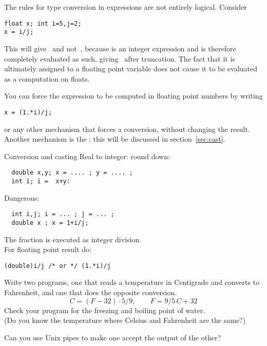 The rules for type conversion in expressions are not entirely
logical. Consider
\begin{verbatim}
float x; int i=5,j=2;
x = i/j;
\end{verbatim}
This will give~ and not~, because  is an integer
expression and is therefore completely evaluated as such, giving~
after truncation. The fact
that it is ultimately assigned to a floating point variable does not
cause it to be evaluated as a computation on floats.

You can force the expression to be computed in floating point numbers
by writing
\begin{verbatim}
x = (1.*i)/j;
\end{verbatim}
or any other mechanism that forces a conversion, without changing the
result.  Another mechanism is the ; this will be
discussed in section~\ref{sec:cast}.

\begin{slide}{Conversion and casting}
  \label{sl:convert-cast}
  Real to integer: round down:
\begin{verbatim}
  double x,y; x = .... ; y = .... ;
  int i; i =  x+y:
\end{verbatim}
Dangerous:
\begin{verbatim}
  int i,j; i = ... ; j = ... ; 
  double x ; x = 1+i/j;
\end{verbatim}
The fraction is executed as integer division.\\
For floating point result do:
\begin{verbatim}
(double)i/j /* or */ (1.*i)/j
\end{verbatim}
\end{slide}

\begin{exercise}
  \label{ex:C2F}
  Write two programs, one that reads a temperature in Centigrade and
  converts to Fahrenheit, and one that does the opposite conversion.
  \[ C = (F-32)\cdot 5/9,\qquad F = 9/5\,C+32 \]
  Check your program for the freezing and boiling point of water.\\
  (Do you know the temperature where Celsius and Fahrenheit are the
  same?)
  
  Can you use Unix pipes to make one accept the output of the other?
\end{exercise}

